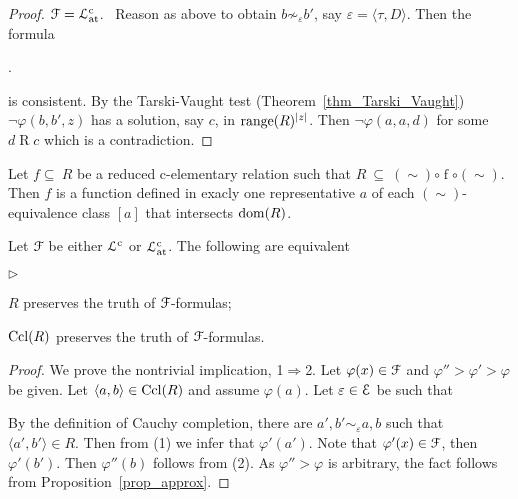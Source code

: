 \documentclass{amsproc}
\newcommand{\mylabel}[1]{{#1}\hfill}
\renewenvironment{itemize}
  {\begin{list}{$\triangleright$}{%
  \setlength{\parskip}{0mm}
  \setlength{\topsep}{.4\baselineskip}
  \setlength{\rightmargin}{0mm}
  \setlength{\listparindent}{0mm}
  \setlength{\itemindent}{0mm}
  \setlength{\labelwidth}{3ex}
  \setlength{\itemsep}{.2\baselineskip}
  \setlength{\parsep}{.2\baselineskip}
  \setlength{\partopsep}{0mm}
  \setlength{\labelsep}{1ex}
  \setlength{\leftmargin}{\labelwidth+\labelsep}
  \let\makelabel\mylabel}}{%
\end{list}}
\begin{document}
{\begin{proof}
  ${\EuScript F}={\EuScript L}^{\rm c}_{\rm at}$. \ 
  Reason as above to obtain $b\not\sim_\varepsilon b'$, say $\varepsilon=\langle\tau,D\rangle$.
  Then the formula 
  
  .
  
  is consistent.
  By the Tarski-Vaught test (Theorem~\ref{thm_Tarski_Vaught}) $\neg\varphi(b,b',z)$ has a solution, say $c$, in ${\rm range}(R)^{|z|}$.
  Then $\neg\varphi(a,a,d)$ for some $d\mathrel{R} c$ which is a contradiction.
\end{proof}

Let $f \subseteq\ R$ be a reduced c-elementary relation such that $R\ \subseteq\ \mathrel{(\sim)}\circ \mathrel{f}\circ\mathrel{(\sim)}$.
Then $f$ is a function defined in exacly one representative $a$ of each $(\sim)$-equivalence class $[a]$ that intersects ${\rm dom}(R)$.

\begin{fact}\label{fact_Rcompletion}
  Let ${\EuScript F}$ be either ${\EuScript L}^{\rm c}$ or ${\EuScript L}^{\rm c}_{\rm at}$.
  The following are equivalent
  \begin{itemize}
    \item[1.] $R$ preserves the truth of ${\EuScript F}$-formulas;
    \item[2.] ${\rm Ccl}(R)$ preserves the truth of ${\EuScript F}$-formulas.
  \end{itemize}
\end{fact}

\begin{proof}
  We prove the nontrivial implication, 1$\Rightarrow$2.
  Let $\varphi(x)\in{\EuScript F}$ and $\varphi''>\varphi'>\varphi$ be given.
  Let $\langle a,b\rangle\in{\rm Ccl}(R)$ and assume $\varphi(a)$.
  Let $\varepsilon\in{\EuScript E}$ be such that 



  By the definition of Cauchy completion, there are $a',b'\sim_\varepsilon\! a,b$ such that $\langle a',b'\rangle\in R$.
  Then from (1) we infer that $\varphi'(a')$.
  Note that $\varphi'(x)\in{\EuScript F}$, then $\varphi'(b')$. 
  Then $\varphi''(b)$ follows from (2).
  As $\varphi''>\varphi$ is arbitrary, the fact follows from Proposition~\ref{prop_approx}.
\end{proof}

}
\end{document}

